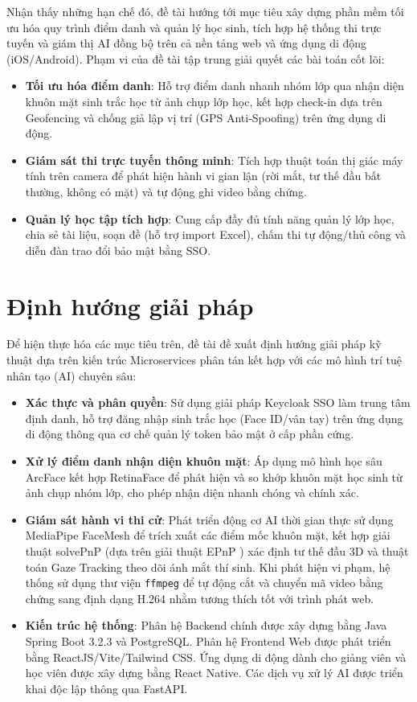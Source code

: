 \documentclass[../DoAn.tex]{subfiles}
\begin{document}
Nhận thấy những hạn chế đó, đề tài hướng tới mục tiêu xây dựng phần mềm tối ưu hóa quy trình điểm danh và quản lý học sinh, tích hợp hệ thống thi trực tuyến và giám thị AI đồng bộ trên cả nền tảng web và ứng dụng di động (iOS/Android). Phạm vi của đề tài tập trung giải quyết các bài toán cốt lõi:
\begin{itemize}
    \item \textbf{Tối ưu hóa điểm danh}: Hỗ trợ điểm danh nhanh nhóm lớp qua nhận diện khuôn mặt sinh trắc học từ ảnh chụp lớp học, kết hợp check-in dựa trên Geofencing và chống giả lập vị trí (GPS Anti-Spoofing) trên ứng dụng di động.
    \item \textbf{Giám sát thi trực tuyến thông minh}: Tích hợp thuật toán thị giác máy tính trên camera để phát hiện hành vi gian lận (rời mắt, tư thế đầu bất thường, không có mặt) và tự động ghi video bằng chứng.
    \item \textbf{Quản lý học tập tích hợp}: Cung cấp đầy đủ tính năng quản lý lớp học, chia sẻ tài liệu, soạn đề (hỗ trợ import Excel), chấm thi tự động/thủ công và diễn đàn trao đổi bảo mật bằng SSO.
\end{itemize}

\section{Định hướng giải pháp}
\label{section:1.3}
Để hiện thực hóa các mục tiêu trên, đề tài đề xuất định hướng giải pháp kỹ thuật dựa trên kiến trúc Microservices phân tán kết hợp với các mô hình trí tuệ nhân tạo (AI) chuyên sâu:
\begin{itemize}
    \item \textbf{Xác thực và phân quyền}: Sử dụng giải pháp Keycloak SSO làm trung tâm định danh, hỗ trợ đăng nhập sinh trắc học (Face ID/vân tay) trên ứng dụng di động thông qua cơ chế quản lý token bảo mật ở cấp phần cứng.
    \item \textbf{Xử lý điểm danh nhận diện khuôn mặt}: Áp dụng mô hình học sâu ArcFace \cite{Deng_2019_CVPR} kết hợp RetinaFace \cite{Deng_2020_CVPR} để phát hiện và so khớp khuôn mặt học sinh từ ảnh chụp nhóm lớp, cho phép nhận diện nhanh chóng và chính xác.
    \item \textbf{Giám sát hành vi thi cử}: Phát triển động cơ AI thời gian thực sử dụng MediaPipe FaceMesh \cite{Lugaresi2019MediaPipe} để trích xuất các điểm mốc khuôn mặt, kết hợp giải thuật solvePnP (dựa trên giải thuật EPnP \cite{Lepetit2009EPnP}) xác định tư thế đầu 3D và thuật toán Gaze Tracking \cite{kaundinya2026inbrowser} theo dõi ánh mắt thí sinh. Khi phát hiện vi phạm, hệ thống sử dụng thư viện \texttt{ffmpeg} để tự động cắt và chuyển mã video bằng chứng sang định dạng H.264 nhằm tương thích tốt với trình phát web.
    \item \textbf{Kiến trúc hệ thống}: Phân hệ Backend chính được xây dựng bằng Java Spring Boot 3.2.3 và PostgreSQL. Phân hệ Frontend Web được phát triển bằng ReactJS/Vite/Tailwind CSS. Ứng dụng di động dành cho giảng viên và học viên được xây dựng bằng React Native. Các dịch vụ xử lý AI được triển khai độc lập thông qua FastAPI.
\end{itemize}
\end{document}
